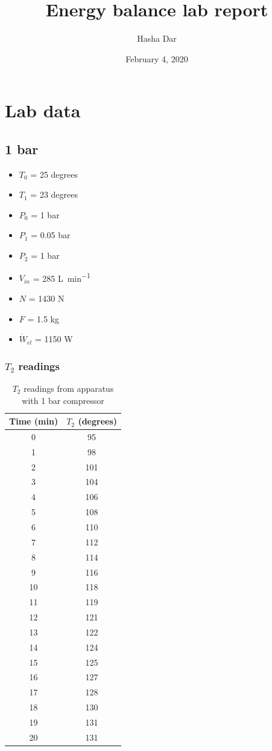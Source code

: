 \documentclass[class=article, crop=false, 12pt,a4paper]{standalone}
\begin{document}
\title{Energy balance lab report}
\author{Hasha Dar}
\date{February 4, 2020}
\maketitle
\tableofcontents
\section{Lab data}
\subsection{1 bar}
\begin{multicols}{2}
  \begin{itemize}[noitemsep]
    \item \(T_0\) = 25 degrees
    \item \(T_1\) = 23 degrees
    \item \(P_0\) = 1 \si{bar}
    \item \(P_1\) = 0.05 \si{bar}
    \item \(P_2\) = 1 \si{\bar}
    \item \(V_{in}\) = 285 \si{\liter\per\minute}
    \item \(N\) = 1430 \si{\newton}
    \item \(F\) = 1.5 \si{\kilogram}
    \item \(\dot{W}_{el}\) = 1150 \si{\watt}
  \end{itemize}
\end{multicols}
\subsubsection{\(T_2\) readings} 
\begin{table}
  \centering
    \begin{tabular}{|c|c|}
      \hline
      Time (\si{\minute}) & \(T_2\) (degrees)\\
      \hline
      0 & 95\\
      1 & 98\\
      2 & 101\\
      3 & 104\\
      4 & 106\\
      5 & 108\\
      6 & 110\\
      7 & 112\\
      8 & 114\\
      9 & 116\\
      10 & 118\\
      11 & 119\\
      12 & 121\\
      13 & 122\\
      14 & 124\\
      15 & 125\\
      16 & 127\\
      17 & 128\\
      18 & 130\\
      19 & 131\\
      20 & 131\\
      \hline
    \end{tabular}
  \caption{\(T_2\) readings from apparatus with 1 bar compressor}
  \label{table:1}
\end{table}
\end{document}
